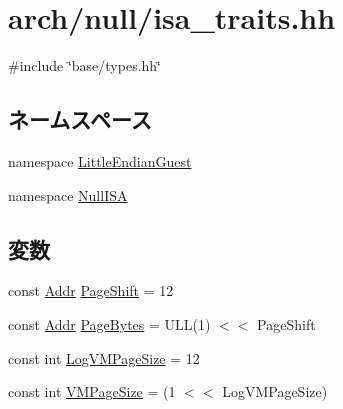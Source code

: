 \hypertarget{null_2isa__traits_8hh}{
\section{arch/null/isa\_\-traits.hh}
\label{null_2isa__traits_8hh}
}
{\ttfamily \#include \char`\"{}base/types.hh\char`\"{}}\par
\subsection*{ネームスペース}
\begin{DoxyCompactItemize}
\item 
namespace \hyperlink{namespaceLittleEndianGuest}{LittleEndianGuest}
\item 
namespace \hyperlink{namespaceNullISA}{NullISA}
\end{DoxyCompactItemize}
\subsection*{変数}
\begin{DoxyCompactItemize}
\item 
const \hyperlink{base_2types_8hh_af1bb03d6a4ee096394a6749f0a169232}{Addr} \hyperlink{namespaceNullISA_a6eacddc1d6d191380d9afdac5920ea48}{PageShift} = 12
\item 
const \hyperlink{base_2types_8hh_af1bb03d6a4ee096394a6749f0a169232}{Addr} \hyperlink{namespaceNullISA_ad9d6a4d965e107c9a7214f096107296b}{PageBytes} = ULL(1) $<$$<$ PageShift
\item 
const int \hyperlink{namespaceNullISA_a554fef169d109a5ccb7ce0dd6a43e521}{LogVMPageSize} = 12
\item 
const int \hyperlink{namespaceNullISA_a891eaf95159d764e6efae501c2860a3a}{VMPageSize} = (1 $<$$<$ LogVMPageSize)
\end{DoxyCompactItemize}
